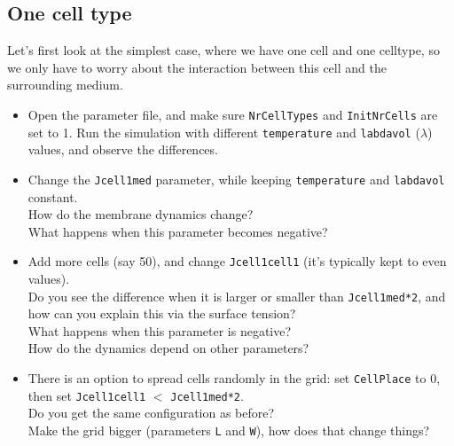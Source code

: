 \documentclass[a4paper,10pt]{article}
\begin{document}
\subsection{One cell type}
Let's first look at the simplest case, where we have one cell and one celltype, so we only have to worry about the interaction between this cell and the surrounding medium.
\begin{itemize}
 \item Open the parameter file, and make sure \texttt{NrCellTypes} and \texttt{InitNrCells} are set to 1. Run the simulation with different \texttt{temperature} and \texttt{labdavol} ($\lambda$) values, and observe the differences.
 \item Change the \texttt{Jcell1med} parameter, while keeping \texttt{temperature} and \texttt{labdavol} constant. \\How do
the membrane dynamics change? \\What happens when this parameter becomes negative?
 \item Add more cells (say 50), and change \texttt{Jcell1cell1} (it's typically kept to even values).\\ Do you see the difference when it is larger 
or smaller than \texttt{Jcell1med*2}, and how can you explain this via the surface tension? \\What happens when this parameter is negative? \\How do 
the dynamics depend on other parameters? 
 \item There is an option to spread cells randomly in the grid: set \texttt{CellPlace} to 0, then set \texttt{Jcell1cell1} $<$ \texttt{Jcell1med*2}.\\ 
Do you get the same configuration as before?\\ Make the grid bigger (parameters \texttt{L} and \texttt{W}), how does that change things?
 
\end{itemize}
\end{document}
